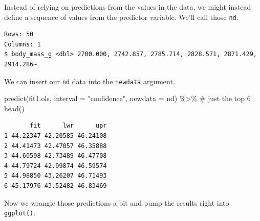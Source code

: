 \documentclass[
  letterpaper,
  DIV=11,
  numbers=noendperiod]{scrartcl}
\newenvironment{Shaded}{\begin{snugshade}}{\end{snugshade}}
\newcommand{\AttributeTok}[1]{\textcolor[rgb]{0.40,0.45,0.13}{#1}}
\newcommand{\CommentTok}[1]{\textcolor[rgb]{0.37,0.37,0.37}{#1}}
\newcommand{\DecValTok}[1]{\textcolor[rgb]{0.68,0.00,0.00}{#1}}
\newcommand{\FunctionTok}[1]{\textcolor[rgb]{0.28,0.35,0.67}{#1}}
\newcommand{\NormalTok}[1]{\textcolor[rgb]{0.00,0.23,0.31}{#1}}
\newcommand{\OtherTok}[1]{\textcolor[rgb]{0.00,0.23,0.31}{#1}}
\newcommand{\SpecialCharTok}[1]{\textcolor[rgb]{0.37,0.37,0.37}{#1}}
\newcommand{\StringTok}[1]{\textcolor[rgb]{0.13,0.47,0.30}{#1}}
\begin{document}
Instead of relying on predictions from the values in the data, we might
instead define a sequence of values from the predictor variable. We'll
call those \texttt{nd}.

\begin{Shaded}
\end{Shaded}

\begin{verbatim}
Rows: 50
Columns: 1
$ body_mass_g <dbl> 2700.000, 2742.857, 2785.714, 2828.571, 2871.429, 2914.286~
\end{verbatim}

We can insert our \texttt{nd} data into the \texttt{newdata} argument.

\begin{Shaded}
\begin{Highlighting}[]
\FunctionTok{predict}\NormalTok{(fit1.ols,}
        \AttributeTok{interval =} \StringTok{"confidence"}\NormalTok{,}
        \AttributeTok{newdata =}\NormalTok{ nd) }\SpecialCharTok{\%\textgreater{}\%} 
  \CommentTok{\# just the top 6}
  \FunctionTok{head}\NormalTok{()}
\end{Highlighting}
\end{Shaded}

\begin{verbatim}
       fit      lwr      upr
1 44.22347 42.20585 46.24108
2 44.41473 42.47057 46.35888
3 44.60598 42.73489 46.47708
4 44.79724 42.99874 46.59574
5 44.98850 43.26207 46.71493
6 45.17976 43.52482 46.83469
\end{verbatim}

Now we wrangle those predictions a bit and pump the results right into
\texttt{ggplot()}.
\end{document}
